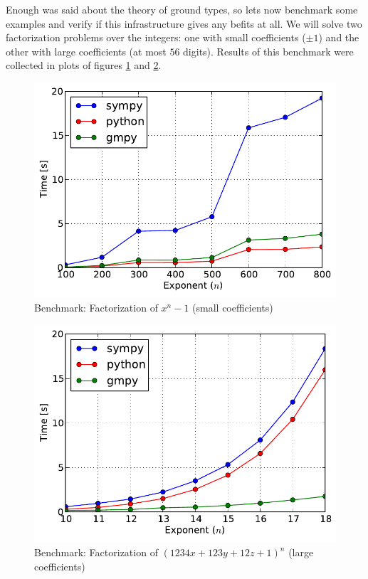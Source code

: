 Enough was said about the theory of ground types, so lets now benchmark some examples and verify
if this infrastructure gives any befits at all. We will solve two factorization problems over the
integers: one with small coefficients ($\pm 1$) and the other with large coefficients (at most $56$
digits). Results of this benchmark were collected in plots of figures \ref{fig-ground-factor-small}
and \ref{fig-ground-factor-large}.
\begin{figure}[htbp]
\centering

\includegraphics{ground-factor-small.pdf}
\caption{Benchmark: Factorization of $x^n - 1$ (small coefficients)\label{fig-ground-factor-small}}\end{figure}
\begin{figure}[htbp]
\centering

\includegraphics{ground-factor-large.pdf}
\caption{Benchmark: Factorization of $(1234 x + 123 y + 12 z + 1)^n$ (large coefficients)\label{fig-ground-factor-large}}\end{figure}

